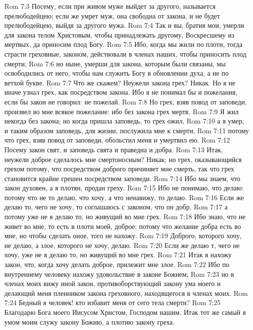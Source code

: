 \vs Rom 7:3 Посему, если при живом муже выйдет за другого, называется прелюбодейцею; если же умрет муж, она свободна от закона, и не будет прелюбодейцею, выйдя за другого мужа.
\vs Rom 7:4 Так и вы, братия мои, умерли для закона телом Христовым, чтобы принадлежать другому, Воскресшему из мертвых, да приносим плод Богу.
\vs Rom 7:5 Ибо, когда мы жили по плоти, тогда страсти греховные,  законом, действовали в членах наших, чтобы приносить плод смерти;
\vs Rom 7:6 но ныне, умерши для закона, которым были связаны, мы освободились от него, чтобы нам служить Богу в обновлении духа, а не по ветхой букве.
\rsbpar\vs Rom 7:7 Что же скажем? Неужели  закона грех? Никак. Но я не иначе узнал грех, как посредством закона. Ибо я не понимал бы и пожелания, если бы закон не говорил: не пожелай.
\vs Rom 7:8 Но грех, взяв повод от заповеди, произвел во мне всякое пожелание: ибо без закона грех мертв.
\vs Rom 7:9 Я жил некогда без закона; но когда пришла заповедь, то грех ожил,
\vs Rom 7:10 а я умер; и таким образом заповедь,  для жизни, послужила мне к смерти,
\vs Rom 7:11 потому что грех, взяв повод от заповеди, обольстил меня и умертвил ею.
\vs Rom 7:12 Посему закон свят, и заповедь свята и праведна и добра.
\vs Rom 7:13 Итак, неужели доброе сделалось мне смертоносным? Никак; но грех, оказывающийся грехом потому, что посредством доброго причиняет мне смерть, так что грех становится крайне грешен посредством заповеди.
\vs Rom 7:14 Ибо мы знаем, что закон духовен, а я плотян, продан греху.
\vs Rom 7:15 Ибо не понимаю, что делаю: потому что не то делаю, что хочу, а что ненавижу, то делаю.
\vs Rom 7:16 Если же делаю то, чего не хочу, то соглашаюсь с законом, что он добр,
\vs Rom 7:17 а потому уже не я делаю то, но живущий во мне грех.
\vs Rom 7:18 Ибо знаю, что не живет во мне, то есть в плоти моей, доброе; потому что желание добра есть во мне, но чтобы сделать оное, того не нахожу.
\vs Rom 7:19 Доброго, которого хочу, не делаю, а злое, которого не хочу, делаю.
\vs Rom 7:20 Если же делаю т, чего не хочу, уже не я делаю то, но живущий во мне грех.
\vs Rom 7:21 Итак я нахожу закон, что, когда хочу делать доброе, прилежит мне злое.
\vs Rom 7:22 Ибо по внутреннему человеку нахожу удовольствие в законе Божием;
\vs Rom 7:23 но в членах моих вижу иной закон, противоборствующий закону ума моего и делающий меня пленником закона греховного, находящегося в членах моих.
\vs Rom 7:24 Бедный я человек! кто избавит меня от сего тела смерти?
\vs Rom 7:25 Благодарю Бога моего Иисусом Христом, Господом нашим. Итак тот же самый я умом моим служу закону Божию, а плотию закону греха.
